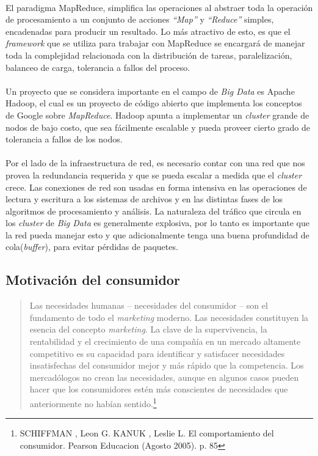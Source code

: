 \paragraph{}
El paradigma MapReduce, simplifica las operaciones al abstraer toda la operaci\'on de procesamiento a un conjunto de acciones \textit{“Map”} y \textit{“Reduce”} simples, encadenadas para producir un resultado. Lo m\'as atractivo de esto, es que el \textit{framework} que se utiliza para trabajar con MapReduce se encargar\'a de manejar toda la complejidad relacionada con la distribuci\'on de tareas, paralelizaci\'on, balanceo de carga, tolerancia a fallos del proceso.
\paragraph{}
Un proyecto que se considera importante en el campo de \textit{Big Data} es Apache Hadoop, el cual es un proyecto de c\'odigo abierto que implementa los conceptos de Google sobre \textit{MapReduce}. Hadoop apunta a implementar un \textit{cluster} grande de nodos de bajo costo, que sea f\'acilmente escalable y pueda proveer cierto grado de tolerancia a fallos de los nodos.
\paragraph{}
Por el lado de la infraestructura de red, es necesario contar con una red que nos provea la redundancia requerida y que se pueda escalar a medida que el \textit{cluster} crece. Las conexiones de red son usadas en forma intensiva en las operaciones de lectura y escritura a los sistemas de archivos y en las distintas fases de los algoritmos de procesamiento y an\'alisis. La naturaleza del tr\'afico que circula en los \textit{cluster} de \textit{Big Data} es generalmente explosiva, por lo tanto es importante que la red pueda manejar esto y que adicionalmente tenga una buena profundidad de cola(\textit{buffer}), para evitar p\'erdidas de paquetes.
\subsection{Motivaci\'on del consumidor}
\begin{quote}
Las necesidades humanas – necesidades del consumidor – son el fundamento de todo el \textit{marketing} moderno. Las necesidades constituyen la esencia del concepto \textit{marketing}. La clave de la supervivencia, la rentabilidad y el crecimiento de una compañ\'ia en un mercado altamente competitivo es su capacidad para identificar y satisfacer necesidades insatisfechas del consumidor mejor y m\'as r\'apido que la competencia.
Los mercad\'ologos no crean las necesidades, aunque en algunos casos pueden hacer que los consumidores est\'en m\'as conscientes de necesidades que anteriormente no hab\'ian sentido.\footnote{SCHIFFMAN , Leon G. KANUK , Leslie L. El comportamiento del consumidor. Pearson Educacion (Agosto 2005). p. 85}
\end{quote}
